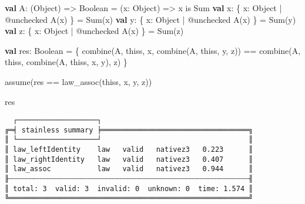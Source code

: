 \documentclass[
  ignorenonframetext,
]{beamer}
\newenvironment{Shaded}{}{}
\newcommand{\FunctionTok}[1]{\textcolor[rgb]{0.02,0.16,0.49}{#1}}
\newcommand{\KeywordTok}[1]{\textcolor[rgb]{0.00,0.44,0.13}{\textbf{#1}}}
\newcommand{\NormalTok}[1]{#1}
\begin{document}
\begin{frame}[fragile]

\begin{Shaded}
\begin{Highlighting}[]
\KeywordTok{val}\NormalTok{ A: (Object) => Boolean = (x: Object) => x is Sum}
\KeywordTok{val}\NormalTok{ x: \{ x: Object | @unchecked }\FunctionTok{A}\NormalTok{(x) \} = }\FunctionTok{Sum}\NormalTok{(x)}
\KeywordTok{val}\NormalTok{ y: \{ x: Object | @unchecked }\FunctionTok{A}\NormalTok{(x) \} = }\FunctionTok{Sum}\NormalTok{(y)}
\KeywordTok{val}\NormalTok{ z: \{ x: Object | @unchecked }\FunctionTok{A}\NormalTok{(x) \} = }\FunctionTok{Sum}\NormalTok{(z)}

\KeywordTok{val}\NormalTok{ res: Boolean = \{}
  \FunctionTok{combine}\NormalTok{(A, thiss, x, }\FunctionTok{combine}\NormalTok{(A, thiss, y, z)) ==}
  \FunctionTok{combine}\NormalTok{(A, thiss, }\FunctionTok{combine}\NormalTok{(A, thiss, x, y), z)}
\NormalTok{\}}

\FunctionTok{assume}\NormalTok{(res == }\FunctionTok{law_assoc}\NormalTok{(thiss, x, y, z))}

\NormalTok{res}
\end{Highlighting}
\end{Shaded}

\end{frame}

\begin{frame}[fragile]

\begin{verbatim}
  ┌───────────────────┐
╔═╡ stainless summary ╞═══════════════════════════════════╗
║ └───────────────────┘                                   ║
║ law_leftIdentity    law   valid   nativez3   0.223      ║
║ law_rightIdentity   law   valid   nativez3   0.407      ║
║ law_assoc           law   valid   nativez3   0.944      ║
╟┄┄┄┄┄┄┄┄┄┄┄┄┄┄┄┄┄┄┄┄┄┄┄┄┄┄┄┄┄┄┄┄┄┄┄┄┄┄┄┄┄┄┄┄┄┄┄┄┄┄┄┄┄┄┄┄┄╢
║ total: 3  valid: 3  invalid: 0  unknown: 0  time: 1.574 ║
╚═════════════════════════════════════════════════════════╝
\end{verbatim}

\end{frame}
\end{document}
